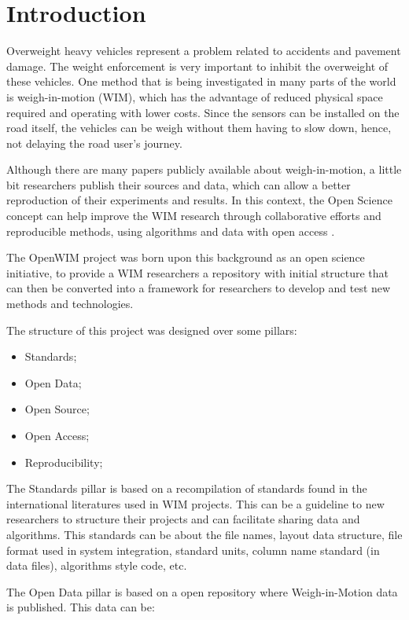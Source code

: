 \documentclass[a4paper]{article}
\begin{document}
\section{Introduction}
{

Overweight heavy vehicles represent a problem related to accidents and pavement damage. The weight enforcement is very important to inhibit the overweight of these vehicles. One method that is being investigated in many parts of the world is weigh-in-motion (WIM), which has the advantage of reduced physical space required and operating with lower costs. Since the sensors can be installed on the road itself, the vehicles can be weigh without them having to slow down, hence, not delaying the road user’s journey.

Although there are many papers publicly available about weigh-in-motion, a little bit researchers publish their sources and data, which can allow a better reproduction of their experiments and results. In this context, the Open Science concept can help improve the WIM research through collaborative efforts and reproducible methods, using algorithms and data with open access \cite{garvin2008yours}.

The OpenWIM project was born upon this background as an open science initiative, to provide a WIM researchers a repository with initial structure that can then be converted into a framework for researchers to develop and test new methods and technologies.

The structure of this project was designed over some pillars:
\begin{itemize}
\item Standards;
\item Open Data;
\item Open Source;
\item Open Access;
\item Reproducibility;
\end{itemize}

The Standards pillar is based on a recompilation of standards found in the international literatures used in WIM projects. This can be a guideline to new researchers to structure their projects and can facilitate sharing data and algorithms. This standards can be about the file names, layout data structure, file format used in system integration, standard units, column name standard (in data files), algorithms style code, etc.

The Open Data pillar is based on a open repository where Weigh-in-Motion data is published. This data can be:

}
\end{document}
